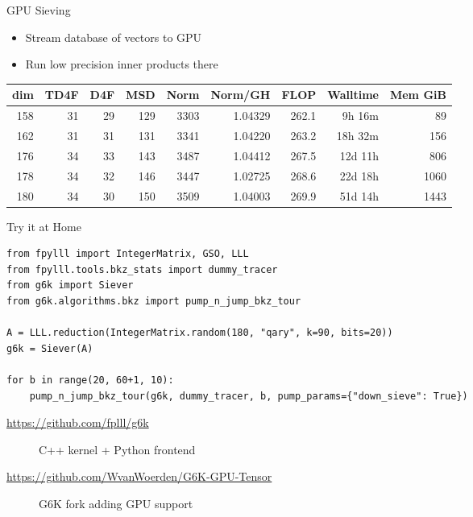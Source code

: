 \documentclass[table,10pt,aspectratio=169]{beamer}
\begin{document}
\begin{frame}[label={sec:org03717da}]{GPU Sieving}
\begin{itemize}
\item Stream database of vectors to GPU
\item Run low precision inner products there
\end{itemize}

\begin{center}
\begin{tabular}{rrrrrrrrr}
\toprule
dim & TD4F & D4F & MSD & Norm & Norm/GH & FLOP & Walltime & Mem GiB\\
\midrule
158 & 31 & 29 & 129 & 3303 & 1.04329 & 262.1 & 9h 16m & 89\\
162 & 31 & 31 & 131 & 3341 & 1.04220 & 263.2 & 18h 32m & 156\\
176 & 34 & 33 & 143 & 3487 & 1.04412 & 267.5 & 12d 11h & 806\\
178 & 34 & 32 & 146 & 3447 & 1.02725 & 268.6 & 22d 18h & 1060\\
180 & 34 & 30 & 150 & 3509 & 1.04003 & 269.9 & 51d 14h & 1443\\
\bottomrule
\end{tabular}

\end{center}

\scriptsize

\end{frame}

\begin{frame}[label={sec:orgcc336e2},fragile]{Try it at Home}
 \lstset{language=sage,label= ,caption= ,captionpos=b,numbers=none}
\begin{lstlisting}
from fpylll import IntegerMatrix, GSO, LLL
from fpylll.tools.bkz_stats import dummy_tracer
from g6k import Siever
from g6k.algorithms.bkz import pump_n_jump_bkz_tour

A = LLL.reduction(IntegerMatrix.random(180, "qary", k=90, bits=20))
g6k = Siever(A)

for b in range(20, 60+1, 10):
    pump_n_jump_bkz_tour(g6k, dummy_tracer, b, pump_params={"down_sieve": True})
\end{lstlisting}

\begin{description}
\item[{\url{https://github.com/fplll/g6k}}] C++ kernel + Python frontend
\item[{\url{https://github.com/WvanWoerden/G6K-GPU-Tensor}}] G6K fork adding GPU support
\end{description}
\end{frame}
\end{document}
